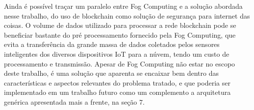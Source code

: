 Ainda é possível traçar um paralelo entre Fog Computing \cite{bonomi2014fog} e a solução abordada nesse trabalho, do uso de blockchain como solução de segurança para internet das coisas. O volume de dados utilizado para processar a rede blockchain pode se beneficiar bastante do pré processamento fornecido pela Fog Computing, que evita a transferência da grande massa de dados coletados pelos sensores inteligentes dos diversos dispositivos IoT para a núvem, tendo um custo de processamento e transmissão. Apesar de Fog Computing não estar no escopo deste trabalho, é uma solução que aparenta se encaixar bem dentro das características e aspectos relevantes do problema tratado, e que poderia ser implementado em um trabalho futuro como um complemento a arquitetura genérica apresentada mais a frente, na seção 7.